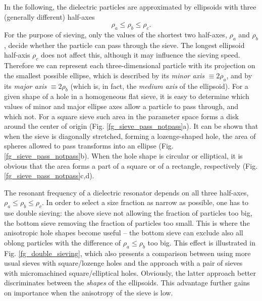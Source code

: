 In the following, the dielectric particles are approximated by ellipsoids with three (generally different) half-axes $$\rho_a \leq \rho_b \leq \rho_c.$$ For the purpose of sieving, only the values of the shortest two half-axes, $\rho_a$ and $\rho_b$, decide whether the particle can pass through the sieve. The longest ellipsoid half-axis $\rho_c$ does not affect this, although it may influence the sieving speed. Therefore we can represent each three-dimensional particle with its projection on the smallest possible ellipse, which is described by its \textit{minor axis} $\equiv 2\rho_a$, and by its \textit{major axis} $\equiv 2\rho_b$ (which is, in fact, the \textit{medium axis} of the ellipsoid). For a given shape of a hole in a homogeneous flat sieve, it is easy to determine which values of minor and major ellipse axes allow a particle to pass through, and which not. For a square sieve such area in the parameter space forms a disk around the center of origin (Fig. \ref{fg_sieve_pass_notpass}a). It can be shown that when the sieve is diagonally stretched, forming a lozenge-shaped hole, the area of spheres allowed to pass transforms into an ellipse (Fig. \ref{fg_sieve_pass_notpass}b). When the hole shape is circular or elliptical, it is obvious that the area forms a part of a square or of a rectangle, respectively  (Fig. \ref{fg_sieve_pass_notpass}c,d).

The resonant frequency of a dielectric resonator depends on all three half-axes, $\rho_a \leq \rho_b \leq \rho_c$. In order to select a size fraction as narrow as possible, one has to use double sieving: the above sieve not allowing the fraction of particles too big, the bottom sieve removing the fraction of particles too small. This is where the anisotropic hole shapes become useful -- the bottom sieve can exclude also all oblong particles with the difference of $\rho_a \leq \rho_b$ too big. This effect is illustrated in Fig. \ref{fg_double_sieving}, which also presents a comparison between using more usual sieves with square/lozenge holes and the approach with a pair of sieves with micromachined square/elliptical holes. Obviously, the latter approach better discriminates between the \textit{shapes} of the ellipsoids. This advantage further gains on importance when the anisotropy of the sieve is low.

